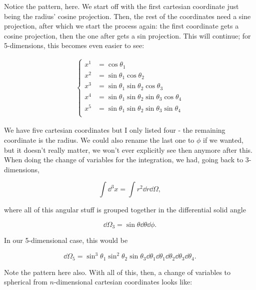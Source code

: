 \documentclass[titlepage]{article}
\begin{document}
Notice the pattern, here. We start off with the first cartesian coordinate just being the radius' cosine projection. Then, the rest of the coordinates need a sine projection, after which we start the process again: the first coordinate gets a cosine projection, then the one after gets a sin projection. This will continue; for 5-dimensions, this becomes even easier to see:

\begin{equation}
  \begin{alignedat}{1}
    \begin{cases}
      x^1 &= \cos\theta_1 \\
      x^2 &= \sin\theta_1\cos\theta_2 \\
      x^3 &= \sin\theta_1\sin\theta_2\cos\theta_3 \\
      x^4 &= \sin\theta_1\sin\theta_2\sin\theta_3\cos\theta_4 \\
      x^5 &= \sin\theta_1\sin\theta_2\sin\theta_3\sin\theta_4 \\      
    \end{cases}
  \end{alignedat}
\end{equation}

We have five cartesian coordinates but I only listed four - the remaining coordinate is the radius. We could also rename the last one to $\phi$ if we wanted, but it doesn't really matter, we won't ever explicitly see then anymore after this. When doing the change of variables for the integration, we had, going back to 3-dimensions,

\begin{equation}
  \int \dd^3x = \int r^2\dd r \dd\Omega,
\end{equation}

where all of this angular stuff is grouped together in the differential solid angle

\begin{equation}
  \dd\Omega_3 = \sin\theta \dd\theta\dd\phi.
\end{equation}

In our 5-dimensional case, this would be

\begin{equation}
  \dd\Omega_5 = \sin^3\theta_1 \sin^2\theta_2 \sin\theta_3 \dd\theta_1 \dd\theta_1\dd\theta_2\dd\theta_3\dd\theta_4.
\end{equation}

Note the pattern here also. With all of this, then, a change of variables to spherical from $n$-dimensional cartesian coordinates looks like:
\end{document}

